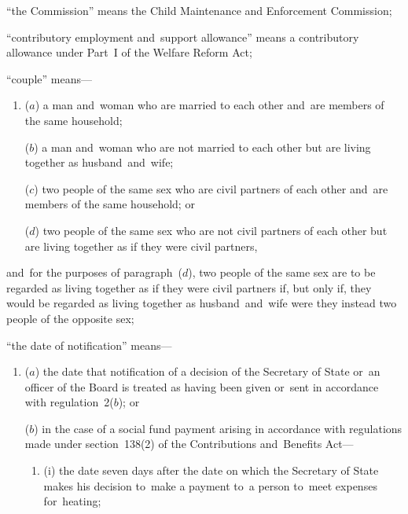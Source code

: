 \documentclass[12pt,a4paper]{article}
\begin{document}
\begin{enumerate}

“the Commission” means the Child Maintenance and Enforcement Commission;

“contributory employment and~support allowance” means a contributory allowance under Part~I of the Welfare Reform Act;

“couple” means—
\begin{enumerate}\item[]
($a$) 
a man and~woman who are married to each other and~are members of the same household;

($b$) 
a man and~woman who are not married to each other but are living together as husband~and~wife;

($c$) 
two people of the same sex who are civil partners of each other and~are members of the same household; or

($d$) 
two people of the same sex who are not civil partners of each other but are living together as if they were civil partners,
\end{enumerate}
and~for the purposes of paragraph~($d$), two people of the same sex are to be regarded as living together as if they were civil partners if, but only if, they would be regarded as living together as husband~and~wife were they instead two people of the opposite sex; 

“the date of notification” means—
\begin{enumerate}\item[]
($a$) the date that notification of a decision of the Secretary of State 
or~an officer of the Board  %
is treated as having been given or~sent in accordance with regulation~2($b$); or

($b$) in the case of a social fund payment arising in accordance with regulations made under section~138(2) of the Contributions and~Benefits Act—
\begin{enumerate}\item[]
(i) the date seven days after the date on which the Secretary of State makes his decision to~make a payment to~a person to~meet expenses for~heating;


\end{enumerate}
\end{enumerate}
\end{enumerate}
\end{document}
